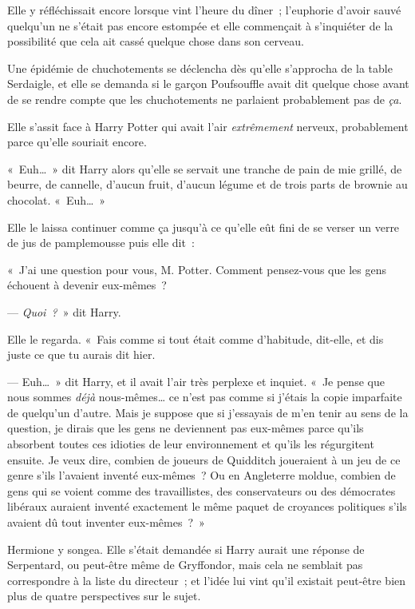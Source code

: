 \later

Elle y réfléchissait encore lorsque vint l'heure du dîner~; l'euphorie d'avoir sauvé quelqu'un ne s'était pas encore estompée et elle commençait à s'inquiéter de la possibilité que cela ait cassé quelque chose dans son cerveau.

Une épidémie de chuchotements se déclencha dès qu'elle s'approcha de la table Serdaigle, et elle se demanda si le garçon Poufsouffle avait dit quelque chose avant de se rendre compte que les chuchotements ne parlaient probablement pas de \emph{ça}.

Elle s'assit face à Harry Potter qui avait l'air \emph{extrêmement} nerveux, probablement parce qu'elle souriait encore.

«~Euh…~» dit Harry alors qu'elle se servait une tranche de pain de mie grillé, de beurre, de cannelle, d'aucun fruit, d'aucun légume et de trois parts de brownie au chocolat. «~Euh…~»

Elle le laissa continuer comme ça jusqu'à ce qu'elle eût fini de se verser un verre de jus de pamplemousse puis elle dit~:

«~J'ai une question pour vous, M. Potter. Comment pensez-vous que les gens échouent à devenir eux-mêmes~?

--- \emph{Quoi~?}~» dit Harry.

Elle le regarda. «~Fais comme si tout était comme d'habitude, dit-elle, et dis juste ce que tu aurais dit hier.

--- Euh…~» dit Harry, et il avait l'air très perplexe et inquiet. «~Je pense que nous sommes \emph{déjà} nous-mêmes… ce n'est pas comme si j'étais la copie imparfaite de quelqu'un d'autre. Mais je suppose que si j'essayais de m'en tenir au sens de la question, je dirais que les gens ne deviennent pas eux-mêmes parce qu'ils absorbent toutes ces idioties de leur environnement et qu'ils les régurgitent ensuite. Je veux dire, combien de joueurs de Quidditch joueraient à un jeu de ce genre s'ils l'avaient inventé eux-mêmes~? Ou en Angleterre moldue, combien de gens qui se voient comme des travaillistes, des conservateurs ou des démocrates libéraux auraient inventé exactement le même paquet de croyances politiques s'ils avaient dû tout inventer eux-mêmes~?~»

Hermione y songea. Elle s'était demandée si Harry aurait une réponse de Serpentard, ou peut-être même de Gryffondor, mais cela ne semblait pas correspondre à la liste du directeur~; et l'idée lui vint qu'il existait peut-être bien plus de quatre perspectives sur le sujet.

